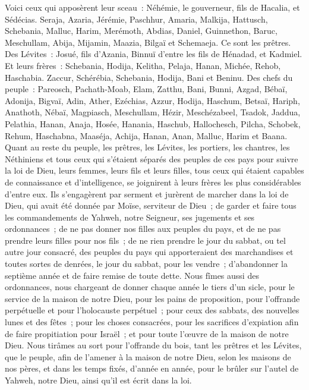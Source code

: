 \begin{multicols}{2}
\VerseOne{}Voici ceux qui apposèrent leur sceau~: Néhémie, le gouverneur, fils de Hacalia, et Sédécias.
Seraja, Azaria, Jérémie,
Paschhur, Amaria, Malkija,
Hattusch, Schebania, Malluc,
Harim, Merémoth, Abdias,
Daniel, Guinnethon, Baruc,
Meschullam, Abija, Mijamin,
Maazia, Bilgaï et Schemaeja. Ce sont les prêtres.
Des Lévites~: Josué, fils d'Azania, Binnuï d'entre les fils de Hénadad, et Kadmiel.
Et leurs frères~: Schebania, Hodija, Kelitha, Pelaja, Hanan,
Michée, Rehob, Haschabia.
Zaccur, Schérébia, Schebania,
Hodija, Bani et Beninu.
Des chefs du peuple~: Pareosch, Pachath-Moab, Elam, Zatthu, Bani,
Bunni, Azgad, Bébaï,
Adonija, Bigvaï, Adin,
Ather, Ezéchias, Azzur,
Hodija, Haschum, Betsaï,
Hariph, Anathoth, Nébaï,
Magpiasch, Meschullam, Hézir,
Meschézabeel, Tsadok, Jaddua,
Pelathia, Hanan, Anaja,
Hosée, Hanania, Haschub,
Hallochesch, Pilcha, Schobek,
Rehum, Haschabna, Maaséja,
Achija, Hanan, Anan,
Malluc, Harim et Baana.
Quant au reste du peuple, les prêtres, les Lévites, les portiers, les chantres, les Néthiniens et tous ceux qui s'étaient séparés des peuples de ces pays pour suivre la loi de Dieu, leurs femmes, leurs fils et leurs filles, tous ceux qui étaient capables de connaissance et d'intelligence,
se joignirent à leurs frères les plus considérables d'entre eux. Ils s'engagèrent par serment et jurèrent de marcher dans la loi de Dieu, qui avait été donnée par Moïse, serviteur de Dieu~; de garder et faire tous les commandements de Yahweh, notre Seigneur, ses jugements et ses ordonnances~;
de ne pas donner nos filles aux peuples du pays, et de ne pas prendre leurs filles pour nos fils~;
de ne rien prendre le jour du sabbat, ou tel autre jour consacré, des peuples du pays qui apporteraient des marchandises et toutes sortes de denrées, le jour du sabbat, pour les vendre~; d'abandonner la septième année et de faire remise de toute dette.
Nous fîmes aussi des ordonnances, nous chargeant de donner chaque année le tiers d'un sicle, pour le service de la maison de notre Dieu,
pour les pains de proposition, pour l'offrande perpétuelle et pour l'holocauste perpétuel~; pour ceux des sabbats, des nouvelles lunes et des fêtes~; pour les choses consacrées, pour les sacrifices d'expiation afin de faire propitiation pour Israël~; et pour toute l'œuvre de la maison de notre Dieu.
Nous tirâmes au sort pour l'offrande du bois, tant les prêtres et les Lévites, que le peuple, afin de l'amener à la maison de notre Dieu, selon les maisons de nos pères, et dans les temps fixés, d'année en année, pour le brûler sur l'autel de Yahweh, notre Dieu, ainsi qu'il est écrit dans la loi.

\end{multicols}
